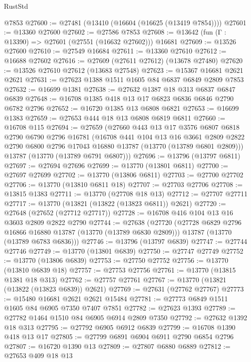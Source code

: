 \begin{lexlean}{RustStd}
\begin{coremodule}
    @7853
@27600 := @27481 (@13410 (@16604 (@16625 (@13419 @7854))))
@27601 := @13360 @27600
@27602 := @27586 @7853
@27608 := @13642 (fun (Γ : @13390) => @27601 (@27551 (@16632 @27602))) @16681
@27609 := @13526 @27600
@27610 := @27549 @16684
@27611 := @13360 @27610
@27612 := @16688 @27602
@27616 := @27609 (@27611 @27612) (@13678 @27480)
@27620 := @13526 @27610 @27612 (@13683 @27548)
@27623 := @15367 @16681 @2621 @2621
@27631 := @27623 @1388 @1511 @1605 @84 @6837 @6849 @2809 @7853
@27632 := @16699 @1381
@27638 := @27632 @1387 @18 @313 @6837 @6847 @6839
@27648 := @16708 @1385 @418 @13 @17 @6823 @6836 @6846 @2790 @6782 @2796
@27652 := @16720 @1385 @13 @6808 @6821
@27653 := @16699 @1383
@27659 := @27653 @444 @18 @13 @6808 @6819 @6811
@27660 := @16708 @115
@27694 := @27659
    (@27660
      @443
      @13
      @17
      @3576
      @6807
      @6818
      @2790
      @6790
      @2796
      @16781
      (@16708
        @441
        @104
        @13
        @16
        @3661
        @2809
        @2822
        @2790
        @6800
        @2796
        @17043
        @16880
        @13787
        (@13770 (@13789 @6801 @2809)))
      @13787
      (@13770 (@13789 @6791 @6807)))
@27696 := @13796 (@13797 @6811)
@27697 := @27694 @27696
@27699 := @13770 (@13801 @6811)
@27700 := @27697 @27699
@27702 := @13770 (@13806 @6811)
@27703 := @27700 @27702
@27706 := @13770 (@13810 @6811 @18)
@27707 := @27703 @27706
@27708 := @13815 @1383
@27711 := @13770 (@27708 @18 @13)
@27712 := @27707 @27711
@27717 := @13770 (@13821 (@13822 (@13823 @6811)) @2621)
@27720 := @27648 (@27652 (@27712 @27717))
@27728 := @16708 @416 @104 @13 @16 @3603 @2809 @2822 @2790
@27744 := @27638
    (@27720
      (@27728 @6829 @2796 @16866 @16880 @13787 (@13770 (@13789 @6830 @2809)))
      @13787
      (@13770 (@13789 @6783 @6836)))
@27746 := @13796 (@13797 @6839)
@27747 := @27744 @27746
@27749 := @13770 (@13801 @6839)
@27750 := @27747 @27749
@27752 := @13770 (@13806 @6839)
@27753 := @27750 @27752
@27756 := @13770 (@13810 @6839 @18)
@27757 := @27753 @27756
@27761 := @13770 (@13815 @1381 @18 @313)
@27762 := @27757 @27761
@27767 := @13770 (@13821 (@13822 (@13823 @6839)) @2621)
@27769 := @27631 (@27762 @27767)
@27773 := @15480 @16681 @2621 @2621 @15484
@27781 := @27773 @6849 @1511 @1605 @84 @6905 @7350 @7407 @7851
@27782 := @27623 @1393
@27789 := @27782 @1464 @1510 @84 @6905 @6914 @2809 @7350
@27792 := @27632 @1392 @18 @313
@27795 := @27792 @6905 @6912 @6839
@27799 := @16708 @1390 @418 @13 @17
@27805 := @27799 @6891 @6904 @6911 @2790 @6854 @2796
@27807 := @16720 @1390 @13
@27809 := @27807 @6880 @6889
@27812 := @27653 @409 @18 @13

\end{coremodule}
\end{lexlean}
